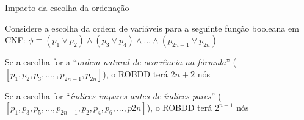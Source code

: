 \expandafter\documentclass\expandafter[table, usenames, svgnames, dvipsnames,14pt, \classopts]{beamer}
\begin{document}
\begin{frame}{Impacto da escolha da ordenação}

    Considere a escolha da ordem de variáveis para a seguinte função booleana em CNF:
    $\phi \equiv (p_1 \lor p_2) \land (p_3 \lor p_4) \land ... \land (p_{2n-1} \lor p_{2n})$

    \begin{outline}
        \small
        \1 Se a escolha for a ``\textit{ordem natural de ocorrência na fórmula}'' ($[p_1,p_2,p_3,...,,p_{2n-1},p_{2n}]$), o ROBDD terá $2n+2$ nós
        
        \vspace{1em}
        
        \1 Se a escolha for ``\textit{índices impares antes de índices pares}'' ($[p_1,p_3,p_5,...,p_{2n-1},p_2,p_4,p_6,...,p{2n}]$), o ROBDD terá $2^{n+1}$ nós
    \end{outline}
    
\end{frame}
\end{document}
